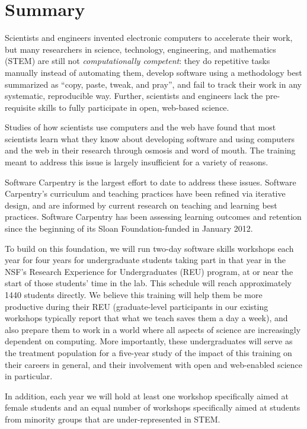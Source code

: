 \documentclass[11pt]{article}
\begin{document}
\section{Summary}

Scientists and engineers invented electronic computers to accelerate
their work, but many researchers in science,
technology, engineering, and mathematics (STEM) are still not
\emph{computationally competent}: they do repetitive tasks manually
instead of automating them, develop software using a methodology best
summarized as ``copy, paste, tweak, and pray'', and fail to track
their work in any systematic, reproducible way. Further, scientists and engineers lack the pre-requisite skills to fully participate in open, web-based science. 

Studies of how scientists use computers and the web have found that
most scientists learn what they know about developing software and
using computers and the web in their research through osmosis and word
of mouth. The training meant to address this issue is largely insufficient for a variety of reasons.

Software Carpentry is the largest effort to date to address these
issues. Software Carpentry's curriculum and teaching practices have been
refined via iterative design, and are informed by current research on
teaching and learning best practices. Software Carpentry has been assessing learning outcomes and retention
since the beginning of its Sloan Foundation-funded in January 2012.

To build on this foundation, we will run two-day software skills workshops each
year for four years for undergraduate students taking part in that
year in the NSF's Research Experience for Undergraduates (REU)
program, at or near the start of those students' time in the lab. 
This schedule will reach approximately 1440 students directly.
 We believe this training will help them be more productive during their
REU (graduate-level participants in our existing workshops typically
report that what we teach saves them a day a week), and also prepare
them to work in a world where all aspects of science are increasingly
dependent on computing.  More importantly, these undergraduates will
serve as the treatment population for a five-year study of the impact
of this training on their careers in general, and their involvement
with open and web-enabled science in particular.

In addition, each year we will hold at least one workshop specifically aimed at female students and an equal number of workshops specifically aimed at students from minority groups that are under-represented in
STEM.
\end{document}
